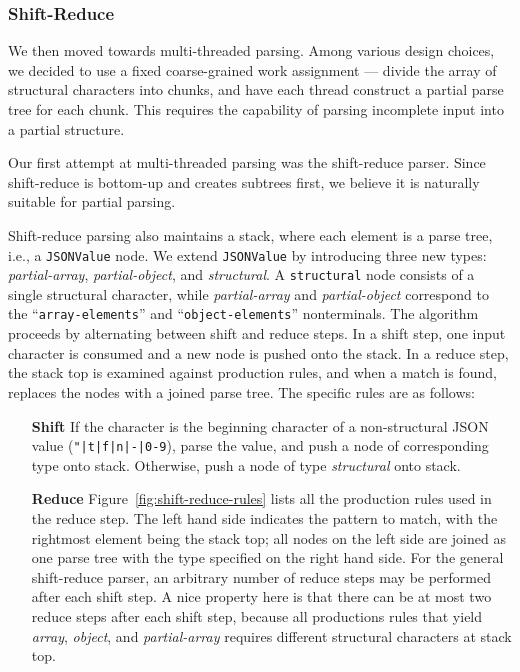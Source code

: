 \documentclass[11pt]{article}
\begin{document}
\subsubsection{Shift-Reduce}
\label{sec:parse:shift-reduce}

We then moved towards multi-threaded parsing. Among various design choices, we decided to use a fixed coarse-grained work assignment --- divide the array of structural characters into chunks, and have each thread construct a partial parse tree for each chunk. This requires the capability of parsing incomplete input into a partial structure.

Our first attempt at multi-threaded parsing was the shift-reduce parser. Since shift-reduce is bottom-up and creates subtrees first, we believe it is naturally suitable for partial parsing.

Shift-reduce parsing also maintains a stack, where each element is a parse tree, i.e., a \texttt{JSONValue} node. We extend \texttt{JSONValue} by introducing three new types: \textit{partial-array}, \textit{partial-object}, and \textit{structural}. A \texttt{structural} node consists of a single structural character, while \textit{partial-array} and \textit{partial-object} correspond to the ``\texttt{array-elements}'' and ``\texttt{object-elements}'' nonterminals. The algorithm proceeds by alternating between shift and reduce steps. In a shift step, one input character is consumed and a new node is pushed onto the stack. In a reduce step, the stack top is examined against production rules, and when a match is found, replaces the nodes with a joined parse tree. The specific rules are as follows:

\begin{itemize}
  \item[\bf Shift] If the character is the beginning character of a non-structural JSON value (\texttt{"|t|f|n|-|0-9}), parse the value, and push a node of corresponding type onto stack. Otherwise, push a node of type \textit{structural} onto stack.
  \item[\bf Reduce] Figure~\ref{fig:shift-reduce-rules} lists all the production rules used in the reduce step. The left hand side indicates the pattern to match, with the rightmost element being the stack top; all nodes on the left side are joined as one parse tree with the type specified on the right hand side. For the general shift-reduce parser, an arbitrary number of reduce steps may be performed after each shift step. A nice property here is that there can be at most two reduce steps after each shift step, because all productions rules that yield \textit{array}, \textit{object}, and \textit{partial-array} requires different structural characters at stack top.
\end{itemize}
\end{document}
